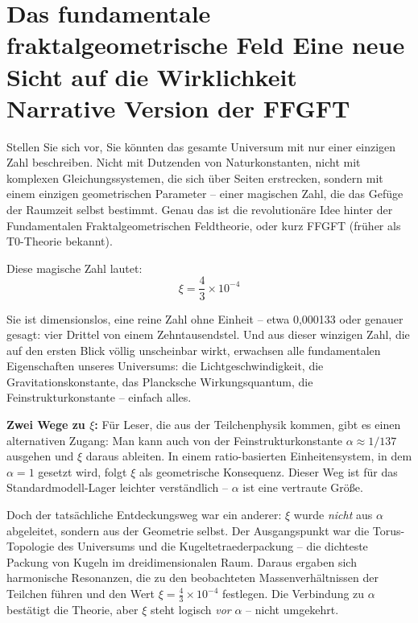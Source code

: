 \chapter{Das fundamentale fraktalgeometrische Feld  Eine neue Sicht auf die Wirklichkeit  Narrative Version der FFGFT}



Stellen Sie sich vor, Sie könnten das gesamte Universum mit nur einer einzigen Zahl beschreiben. Nicht mit Dutzenden von Naturkonstanten, nicht mit komplexen Gleichungssystemen, die sich über Seiten erstrecken, sondern mit einem einzigen geometrischen Parameter – einer magischen Zahl, die das Gefüge der Raumzeit selbst bestimmt. Genau das ist die revolutionäre Idee hinter der Fundamentalen Fraktalgeometrischen Feldtheorie, oder kurz FFGFT (früher als T0-Theorie bekannt).

Diese magische Zahl lautet:
\begin{equation}
\xi = \frac{4}{3} \times 10^{-4}
\end{equation}

Sie ist dimensionslos, eine reine Zahl ohne Einheit -- etwa 0,000133 oder genauer gesagt: vier Drittel von einem Zehntausendstel. Und aus dieser winzigen Zahl, die auf den ersten Blick völlig unscheinbar wirkt, erwachsen alle fundamentalen Eigenschaften unseres Universums: die Lichtgeschwindigkeit, die Gravitationskonstante, das Plancksche Wirkungsquantum, die Feinstrukturkonstante -- einfach alles.

\textbf{Zwei Wege zu $\xi$:} Für Leser, die aus der Teilchenphysik kommen, gibt es einen alternativen Zugang: Man kann auch von der Feinstrukturkonstante $\alpha \approx 1/137$ ausgehen und $\xi$ daraus ableiten. In einem ratio-basierten Einheitensystem, in dem $\alpha = 1$ gesetzt wird, folgt $\xi$ als geometrische Konsequenz. Dieser Weg ist für das Standardmodell-Lager leichter verständlich -- $\alpha$ ist eine vertraute Größe.

Doch der tatsächliche Entdeckungsweg war ein anderer: $\xi$ wurde \textit{nicht} aus $\alpha$ abgeleitet, sondern aus der Geometrie selbst. Der Ausgangspunkt war die Torus-Topologie des Universums und die Kugeltetraederpackung -- die dichteste Packung von Kugeln im dreidimensionalen Raum. Daraus ergaben sich harmonische Resonanzen, die zu den beobachteten Massenverhältnissen der Teilchen führen und den Wert $\xi = \frac{4}{3} \times 10^{-4}$ festlegen. Die Verbindung zu $\alpha$ bestätigt die Theorie, aber $\xi$ steht logisch \textit{vor} $\alpha$ -- nicht umgekehrt.

